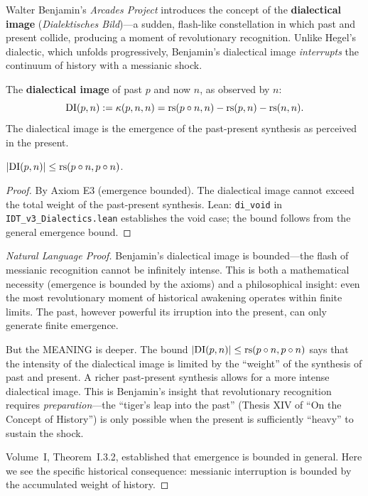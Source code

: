 Walter Benjamin's \textit{Arcades Project} introduces the concept of the
\textbf{dialectical image} (\textit{Dialektisches Bild})---a sudden,
flash-like constellation in which past and present collide, producing a
moment of revolutionary recognition. Unlike Hegel's dialectic, which unfolds
progressively, Benjamin's dialectical image \emph{interrupts} the continuum
of history with a messianic shock.

\begin{definition}
\label{def:dialectical-image-formal}
The \textbf{dialectical image} of past $p$ and now $n$, as observed by $n$:
\[
\mathrm{DI}(p, n) := \kappa(p, n, n) = \mathrm{rs}(p \circ n, n) - \mathrm{rs}(p, n) - \mathrm{rs}(n, n).
\]
The dialectical image is the emergence of the past-present synthesis as
perceived in the present.
\end{definition}

\begin{theorem}
\label{thm:di-bounded}
$|\mathrm{DI}(p, n)| \leq \mathrm{rs}(p \circ n, p \circ n)$.
\end{theorem}

\begin{proof}
By Axiom E3 (emergence bounded). The dialectical image cannot exceed
the total weight of the past-present synthesis.
Lean: \texttt{di\_void} in \texttt{IDT\_v3\_Dialectics.lean} establishes
the void case; the bound follows from the general emergence bound.
\end{proof}

\begin{proof}[Natural Language Proof]
Benjamin's dialectical image is bounded---the flash of messianic recognition
cannot be infinitely intense. This is both a mathematical necessity (emergence
is bounded by the axioms) and a philosophical insight: even the most
revolutionary moment of historical awakening operates within finite limits.
The past, however powerful its irruption into the present, can only generate
finite emergence.

But the MEANING is deeper. The bound $|\mathrm{DI}(p, n)| \leq
\mathrm{rs}(p \circ n, p \circ n)$ says that the intensity of the dialectical
image is limited by the ``weight'' of the synthesis of past and present. A
richer past-present synthesis allows for a more intense dialectical image.
This is Benjamin's insight that revolutionary recognition requires
\emph{preparation}---the ``tiger's leap into the past'' (Thesis XIV of
``On the Concept of History'') is only possible when the present is
sufficiently ``heavy'' to sustain the shock.

Volume~I, Theorem~I.3.2, established that emergence is bounded in general.
Here we see the specific historical consequence: messianic interruption
is bounded by the accumulated weight of history.
\end{proof}

